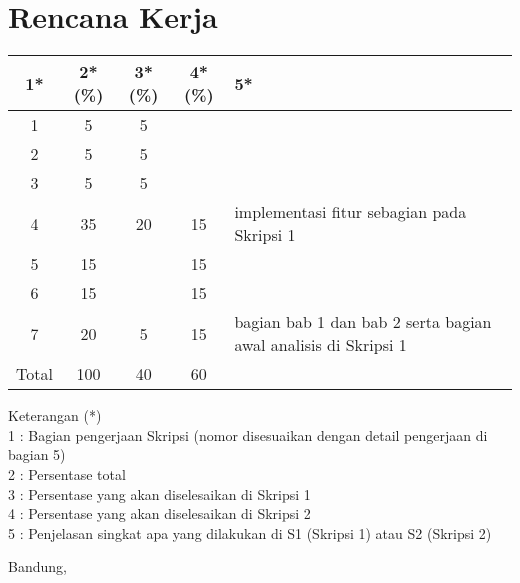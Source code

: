 \documentclass[a4paper,twoside]{article}
\begin{document}
\section{Rencana Kerja}

\begin{center}
  	\begin{tabular}{ | c | c | c | c | l |}
    \hline
    1*  & 2*(\%) & 3*(\%) & 4*(\%) &5*\\ \hline \hline
    1   & 5 & 5 &  &  \\ \hline
    2   & 5 & 5 &  & \\ \hline
    3   & 5 & 5 &  &  \\ \hline
    4   & 35 & 20 & 15 &  {\footnotesize implementasi fitur sebagian pada Skripsi 1} \\ \hline
    5   & 15 &    & 15 &  \\ \hline
    6   & 15 &    & 15 &  \\ \hline
    7   & 20 & 5 & 15 &  {\footnotesize bagian bab 1 dan bab 2 serta bagian awal analisis di Skripsi 1} \\ \hline
    Total  & 100  & 40  & 60 &  \\ \hline
	\end{tabular}
\end{center}

Keterangan (*)\\
1 : Bagian pengerjaan Skripsi (nomor disesuaikan dengan detail pengerjaan di bagian 5)\\
2 : Persentase total \\
3 : Persentase yang akan diselesaikan di Skripsi 1 \\
4 : Persentase yang akan diselesaikan di Skripsi 2 \\
5 : Penjelasan singkat apa yang dilakukan di S1 (Skripsi 1) atau S2 (Skripsi 2)
\pagebreak

\vspace{1cm}
\centering Bandung, \tanggal\\
\vspace{2cm} \nama \\ 
\vspace{1cm}
\end{document}
